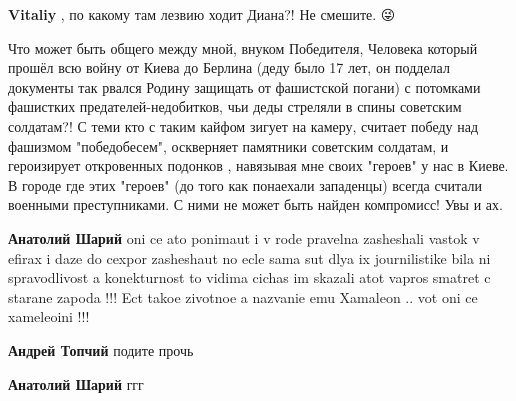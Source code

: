 \begin{itemize}
\begin{itemize}
\textbf{Vitaliy} , по какому там лезвию ходит Диана?! \Laughey[1.0][white]\Laughey[1.0][white] Не смешите. 😜\Laughey[1.0][white]


Что может быть общего между мной, внуком Победителя, Человека который прошёл
всю войну от Киева до Берлина (деду было 17 лет, он подделал документы так
рвался Родину защищать от фашистской погани) с потомками фашистких
предателей-недобитков, чьи деды стреляли в спины советским солдатам?! С теми
кто с таким кайфом зигует на камеру, считает победу над фашизмом "победобесем",
оскверняет памятники советским солдатам, и героизирует откровенных подонков ,
навязывая мне своих "героев" у нас в Киеве. В городе где этих "героев" (до того
как понаехали западенцы) всегда считали военными преступниками. С ними не может
быть найден компромисс! Увы и ах.

 
\textbf{Анатолий Шарий} oni ce ato ponimaut i v rode pravelna zasheshali vastok
v efirax i daze do cexpor zasheshaut no ecle sama sut dlya ix journilistike
bila ni spravodlivost a konekturnost to vidima cichas im skazali atot vapros
smatret c starane zapoda !!! Ect takoe zivotnoe a nazvanie emu Xamaleon .. vot
oni ce xameleoini !!!

 

\textbf{Андрей Топчий} подите прочь

 
\textbf{Анатолий Шарий} ггг

 

\end{itemize}
\end{itemize}
